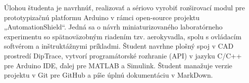 Úlohou študenta je navrhnúť, realizovať a sériovo vyrobiť rozširovací modul pre prototypizačnú platformu Arduino v rámci open-source projektu „AutomationShield“. Jedná sa o návrh miniaturizovaného laboratórneho experimentu so spätnoväzobným riadením tzv. aerokyvadla, spolu s ovládacím softvérom a inštruktážnymi príkladmi. Študent navrhne plošný spoj v CAD prostredí DipTrace, vytvorí programátorské rozhranie (API) v jazyku C/C++ pre Arduino IDE, ďalej pre MATLAB a Simulink. Študent manažuje verzie projektu v Git pre GitHub a píše úplnú dokumentáciu v MarkDown.

\cleardoublepage

	
